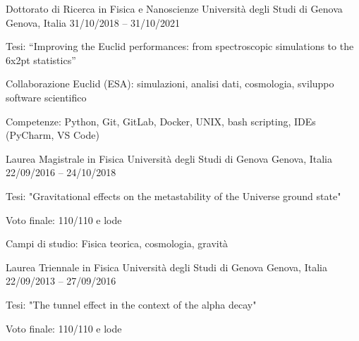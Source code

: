 


\begin{cventries}


\cventry
{Dottorato di Ricerca in Fisica e Nanoscienze} %
{Università degli Studi di Genova} %
{Genova, Italia} %
{31/10/2018 -- 31/10/2021} %
{ %
\begin{cvitems}
\item {Tesi: ``Improving the Euclid performances: from spectroscopic simulations to the 6x2pt statistics''}
\item {Collaborazione Euclid (ESA): simulazioni, analisi dati, cosmologia, sviluppo software scientifico}
\item {Competenze: Python, Git, GitLab, Docker, UNIX, bash scripting, IDEs (PyCharm, VS Code)}
\end{cvitems}
}


\cventry
{Laurea Magistrale in Fisica} %
{Università degli Studi di Genova} %
{Genova, Italia} %
{22/09/2016 -- 24/10/2018} %
{ %
\begin{cvitems}
\item {Tesi: "Gravitational effects on the metastability of the Universe ground state"}
\item {Voto finale: 110/110 e lode}
\item {Campi di studio: Fisica teorica, cosmologia, gravità}
\end{cvitems}
}


\cventry
{Laurea Triennale in Fisica} %
{Università degli Studi di Genova} %
{Genova, Italia} %
{22/09/2013 -- 27/09/2016} %
{ %
\begin{cvitems}
\item {Tesi: "The tunnel effect in the context of the alpha decay"}
\item {Voto finale: 110/110 e lode}
\end{cvitems}
}


\end{cventries}